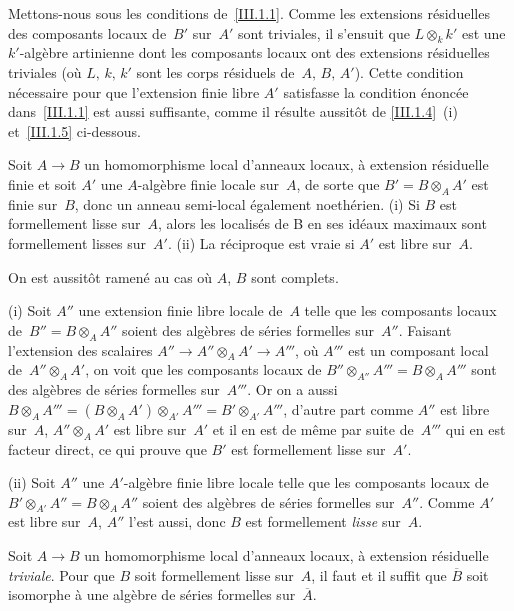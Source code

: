 \medskip
Mettons-nous sous les conditions de~\ref{III.1.1}. Comme les
extensions
r\'esiduelles des composants locaux de~$B'$ sur~$A'$ sont triviales,
il s'ensuit que $L\otimes_k k'$ est une $k'$-alg\`ebre artinienne
dont les composants locaux ont des extensions r\'esiduelles
triviales (o\`u $L,\, k,\, k'$ sont les corps r\'esiduels de~$A,\,
B,\, A'$). Cette condition n\'ecessaire pour que l'extension finie
libre $A'$ satisfasse la condition \'enonc\'ee dans~\ref{III.1.1}
est aussi suffisante, comme il r\'esulte aussit\^ot de
\ref{III.1.4}~(i) et~\ref{III.1.5} ci-dessous.

\begin{proposition}
\label{III.1.4}
Soit $A\to B$ un homomorphisme local d'anneaux locaux, \`a extension
r\'esiduelle finie
et
soit $A'$ une $A$-alg\`ebre finie locale sur~$A$, de sorte que
$B'=B\otimes_A A'$ est finie sur~$B$, donc un anneau semi-local
\'egalement noeth\'erien. \textup{(i)} Si $B$ est formellement lisse
sur~$A$, alors les localis\'es de B en ses id\'eaux maximaux sont
formellement lisses sur~$A'$. \textup{(ii)} La r\'eciproque est vraie
si $A'$ est libre sur~$A$.
\end{proposition}

On est aussit\^ot ramen\'e au cas o\`u $A$, $B$ sont complets.

(i) Soit $A''$ une extension finie libre locale de~$A$ telle que les
composants locaux de~$B''=B\otimes_A A''$ soient des alg\`ebres de
s\'eries formelles sur~$A''$. Faisant l'extension des scalaires
$A''\to A''\otimes_A A' \to A'''$, o\`u $A'''$ est un composant
local de~$A''\otimes_A A'$, on voit que les composants locaux de
$B''\otimes_{A''} A'''=B\otimes_A A'''$ sont des alg\`ebres de
s\'eries formelles sur~$A'''$. Or on a aussi
$B\otimes_AA'''=(B\otimes_A A')\otimes_{A'} A'''=B'\otimes_{A'} A'''$,
d'autre
part comme $A''$ est libre sur~$A$, $A''\otimes_A A'$ est libre sur~$A'$ et il en est de m\^eme par suite de~$A'''$ qui en est facteur
direct, ce qui prouve que $B'$ est formellement lisse sur~$A'$.

(ii) Soit $A''$ une $A'$-alg\`ebre finie libre locale telle que les
composants locaux de~$B'\otimes_{A'} A'' = B\otimes_A A''$ soient des
alg\`ebres de s\'eries formelles sur~$A''$. Comme $A'$ est libre
sur~$A$, $A''$ l'est aussi, donc $B$ est formellement \emph{lisse}
sur~$A$.

\begin{proposition}
\label{III.1.5}
Soit $A\to B$ un homomorphisme local d'anneaux locaux, \`a extension
r\'esiduelle \emph{triviale}. Pour que $B$ soit formellement lisse
sur~$A$, il faut et il suffit que $\overline{B}$ soit isomorphe \`a
une alg\`ebre de s\'eries formelles sur~$\overline{A}$.
\end{proposition}

